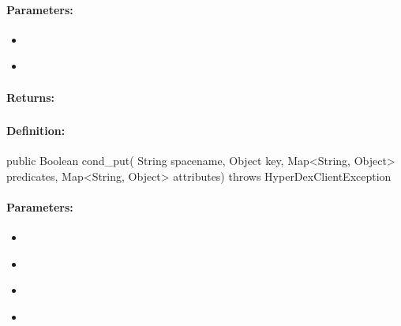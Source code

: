 \paragraph{Parameters:}
\begin{itemize}[noitemsep]
\item {}\\

\item {}\\

\end{itemize}

\paragraph{Returns:}


\pagebreak
\subsubsection{}
\label{api:java:cond_put}


\paragraph{Definition:}
\begin{javacode}
public Boolean cond_put(
        String spacename,
        Object key,
        Map<String, Object> predicates,
        Map<String, Object> attributes) throws HyperDexClientException
\end{javacode}

\paragraph{Parameters:}
\begin{itemize}[noitemsep]
\item {}\\

\item {}\\

\item {}\\

\item {}\\

\end{itemize}

